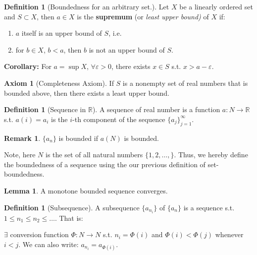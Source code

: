 \documentclass[12pt]{article}
\newcommand{\R}{{\mathbb R}}
\theoremstyle{definition}
\newtheorem{axiom}[theorem]{Axiom}
\newtheorem{definition}[theorem]{Definition}
\newtheorem{lemma}[theorem]{Lemma}
\newtheorem{remark}[theorem]{Remark}
\theoremstyle{plain}
\begin{document}
\begin{definition}
    [Boundedness for an arbitrary set.]

    Let $X$ be a linearly ordered set and $S \subset X$, then $a \in X$ is 
    the \textbf{supremum} (or \textit{least upper bound) }of $X$ if: 
    \begin{enumerate}
        \item $a$ itself is an upper bound of $S$, i.e. 
        \item for $b \in X$, $b < a$, then $b$ is not an upper bound of $S$.
    \end{enumerate}

    \textbf{Corollary: } For $a = \sup X$, $\forall \varepsilon > 0$, there 
    exists $x \in S$ s.t. $x > a - \varepsilon$.
\end{definition}

\begin{axiom}
    [Completeness Axiom] 
    If $S$ is a nonempty set of real numbers that is bounded above, then there 
    exists a least upper bound.
\end{axiom}

\begin{definition}
    [Sequence in $\R$]
    A sequence of real number is a function $a : N \to \R$ s.t. $a(i) = a_i$ is 
    the $i$-th component of the sequence $\{a_j\}_{j=1}^\infty$.
\end{definition}

\begin{remark}
    $\{a_n\}$ is bounded if $a(N)$ is bounded.

    Note, here $N$ is the set of all natural numbers $\{1,2,\ldots,\}$. Thus, 
    we hereby define the boundedness of a sequence using the our previous 
    definition of set-boundedness.
\end{remark}

\begin{lemma}
    \label{lemma:1_B_W_Thm}
    A monotone bounded sequence converges.
\end{lemma}

\begin{definition}
    [Subsequence]

    A subsequence $\{a_{n_i}\}$ of $\{a_n\}$ is a sequence s.t. $1 \le n_1 \le 
    n_2 \le \ldots$. That is: 

    $ \exists $  conversion function $\Phi : N \to N$ s.t. $n_ i = \Phi(i)$ and 
    $\Phi(i) < \Phi(j)$ whenever $i < j$. We can also write: $a_{n_i} = 
    a_{\Phi(i)}$.
\end{definition}
\end{document}
